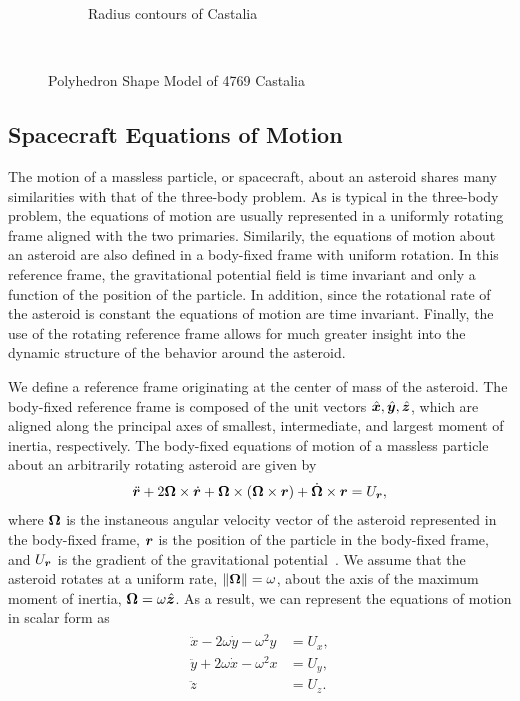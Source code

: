 \documentclass[]{aiaa-tc}%
\begin{document}
\begin{figure}
\begin{subfigure}[htbp]{0.5\textwidth}
		\caption{Radius contours of Castalia} \label{fig:radius_contour}
	\end{subfigure} ~ %
	\caption{Polyhedron Shape Model of 4769 Castalia}
	\label{fig:castalia}
\end{figure}

\subsection{Spacecraft Equations of Motion}

The motion of a massless particle, or spacecraft, about an asteroid shares many similarities with that of the three-body problem.
As is typical in the three-body problem, the equations of motion are usually represented in a uniformly rotating frame aligned with the two primaries.
Similarily, the equations of motion about an asteroid are also defined in a body-fixed frame with uniform rotation.
In this reference frame, the gravitational potential field is time invariant and only a function of the position of the particle.
In addition, since the rotational rate of the asteroid is constant the equations of motion are time invariant.
Finally, the use of the rotating reference frame allows for much greater insight into the dynamic structure of the behavior around the asteroid.

We define a reference frame originating at the center of mass of the asteroid.
The body-fixed reference frame is composed of the unit vectors \( \hat{\bm{x}} , \hat{\bm{y}}, \hat{\bm{z}} \), which are aligned along the principal axes of smallest, intermediate, and largest moment of inertia, respectively.
The body-fixed equations of motion of a massless particle about an arbitrarily rotating asteroid are given by
\begin{align}\label{eq:body_eoms}
	\ddot{\bm{r}} + 2 \bm{\Omega} \times \dot{\bm{r}} + \bm{\Omega} \times \left(  \bm{\Omega} \times \bm{r}  \right) + \dot{\bm{\Omega}} \times \bm{r} = U_{\bm{r}} ,
\end{align}
where \( \bm{\Omega} \) is the instaneous angular velocity vector of the asteroid represented in the body-fixed frame, \( \bm{r} \) is the position of the particle in the body-fixed frame, and \( U_{\bm{r}} \) is the gradient of the gravitational potential~\cite{scheeres2012a}.
We assume that the asteroid rotates at a uniform rate, \( \left\| \bm{\Omega} \right\| = \omega \), about the axis of the maximum moment of inertia, \( \bm{\Omega} = \omega \hat{\bm{z} }\).
As a result, we can represent the equations of motion in scalar form as
\begin{align} \label{eq:eoms}
	\begin{split}
    	\ddot{x} - 2 \omega \dot{y} - \omega^2 y &= U_x , \\
    	\ddot{y} + 2 \omega \dot{x} - \omega^2 x &= U_y , \\
    	\ddot{z} &= U_z .
	\end{split}
\end{align}
\end{document}
